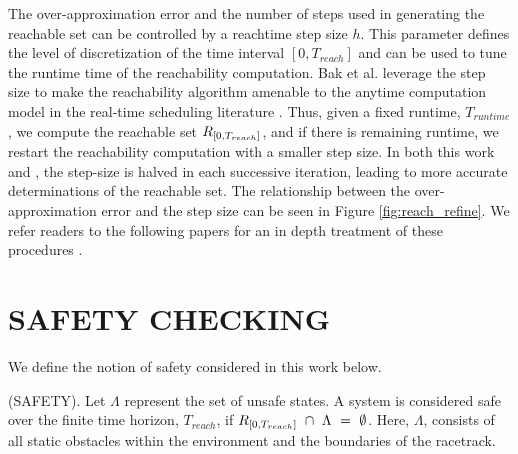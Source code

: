 \documentclass[manuscript,screen,review]{acmart}
\begin{document}
The over-approximation error and the number of steps used in generating the reachable set can be controlled by a reachtime step size $h$. This parameter defines the level of discretization  of the time interval $[0,T_{reach}]$ and can be used to tune the runtime time of the reachability computation. Bak et al. leverage the step size to make the reachability algorithm amenable to the anytime computation model in the real-time scheduling literature \cite{Liu1991}. Thus, given a fixed runtime, $T_{runtime}$, we compute the reachable set $\mathnormal{R}_{[0,T_{reach}]}$, and if there is remaining runtime, we restart the reachability computation with a smaller step size. In both this work and \cite{Bak2014}, the step-size is halved in each successive iteration, leading to more accurate determinations of the reachable set. The relationship between the over-approximation error and the step size can be seen in Figure \ref{fig:reach_refine}. We refer readers to the following papers for an in depth treatment of these procedures \cite{dang2000,Bak2014,Johnson2016}.










\section{SAFETY CHECKING}

We define the notion of safety considered in this work below. \smallskip
\begin{definition}%
(SAFETY). Let $\Lambda$ represent the set of unsafe states. A system is considered safe over the finite time horizon, $T_{reach}$, if  $\mathnormal{R}_{[0,T_{reach}]} \  \cap \ \Lambda \ = \ \emptyset$. Here, $\Lambda$, consists of all static obstacles within the environment and the boundaries of the racetrack.
\end{definition}%
\end{document}

